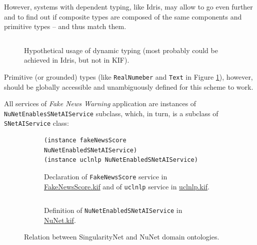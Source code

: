 \documentclass[]{report}
\begin{document}
However, systems with dependent typing, like Idris, may allow to go even further
and to find out if composite types are composed of the same components and
primitive types -- and thus match them.

\begin{figure}[H]
  \captionsetup{width=0.8\linewidth}
  \inputminted[firstline=7, lastline=26, linenos,tabsize=2,breaklines, fontsize=\small]{scm}{../../../ontology/uclnlpDynamic.kif}
  \vspace{-0.3cm}
  \caption{\label{fig:uclnlpDynamicTwo}Hypothetical usage of dynamic typing
  (most probably could be achieved in Idris, but not in KIF).}
\end{figure}

Primitive (or grounded) types (like \texttt{RealNumeber} and \texttt{Text} in
Figure \ref{fig:uclnlpDynamicTwo}), however, should be globally accessible and
unambiguously defined for this scheme to work.

All services of \textit{Fake News Warning} application are instances of
\texttt{NuNetEnablesSNetAIService} subclass, which, in turn, is a subclass of
\texttt{SNetAIService} class:
\begin{figure}[H]
  \begin{subfigure}[t]{1\textwidth}
    \centering
    \begin{verbatim}
(instance fakeNewsScore NuNetEnabledSNetAIService)
(instance uclnlp NuNetEnabledSNetAIService)
    \end{verbatim}
    \vspace{-0.3cm}
    \captionsetup{width=0.8\linewidth}
    \caption{Declaration of \texttt{FakeNewsScore} service in
    \href{https://github.com/singnet/ai-dsl/blob/master/ontology/
    FakeNewsScore.kif}{FakeNewsScore.kif} and of \texttt{uclnlp} service
    in \href{https://github.com/singnet/ai-dsl/blob/master/ontology/uclnlp.kif}{uclnlp.kif}.}
    \vspace{0.3cm}
  \end{subfigure}
  \begin{subfigure}[t]{1\textwidth}
    \centering
    \inputminted[firstline=1, lastline=2, linenos,tabsize=2,breaklines, fontsize=\small]{scm}{../../../ontology/NuNet.kif}
    \vspace{-0.3cm}
    \captionsetup{width=0.8\linewidth}
    \caption{Definition of \texttt{NuNetEnabledSNetAIService} in \href{https://github.com/singnet/ai-dsl/blob/master/ontology/NuNet.kif}{NuNet.kif}.}
  \end{subfigure}
  \captionsetup{width=0.9\linewidth}
  \caption{Relation between SingularityNet and NuNet domain ontologies.}
  \label{fig:SNET_and_NuNet}
\end{figure}
\end{document}
